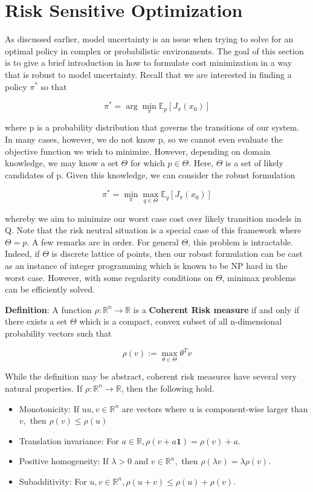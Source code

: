\documentclass[twoside]{article}
\begin{document}
\section{Risk Sensitive Optimization}
As discussed earlier, model uncertainty is an issue when trying to solve for an optimal policy in complex
or probabilistic environments. The goal of this section is to give a brief introduction in how to formulate cost minimization in a way that is robust to model uncertainty. Recall that we are interested in finding a policy $\pi^*$ so that

$$ 
\pi^{*}=\arg \min _{\pi} \mathbb{E}_{p}\left[J_{\pi}\left(x_{0}\right)\right]
 $$

where p is a probability distribution that governs the transitions of our system. In many cases, however, we do not know p, so we cannot even evaluate the objective function we wish to minimize. However, depending on domain knowledge, we may know a set $\Theta$ for which $p\in \Theta$. Here, $\Theta$ is a set of likely candidates of p. Given this knowledge, we can consider the robust formulation

$$ 
\pi^{*}=\min _{\pi} \max _{q \in \Theta} \mathbb{E}_{q}\left[J_{\pi}\left(x_{0}\right)\right]
 $$

whereby we aim to minimize our worst case cost over likely transition models in Q. Note that the risk neutral situation is a special case of this framework where $\Theta = {p}$. A few remarks are in order. For general $\Theta$, this problem is intractable. Indeed, if $\Theta$ is discrete lattice of points, then our robust formulation can be cast as an instance of integer programming which is known to be NP hard in the worst case. However, with some regularity conditions on $\Theta$, minimax problems can be efficiently solved.

\textbf{Definition}: A function $\rho : \mathbb{R}^n \rightarrow \mathbb{R}$ is a \textbf{Coherent Risk measure} if and only if there exists a set $\Theta$ which is
a compact, convex subset of all n-dimensional probability vectors such that

$$ 
\rho(v) :=\max _{\theta \in \Theta} \theta^{T} v
 $$

While the definition may be abstract, coherent risk measures have several very natural properties. If
$\rho : \mathbb{R}^{n} \rightarrow \mathbb{R}$, then the following hold.
\begin{itemize}
\item Monotonicity: If u$u, v \in \mathbb{R}^{n}$ are vectors where u is component-wise larger than $v,$ then $\rho(v) \leq \rho(u)$
\item Translation invariance: For $a \in \mathbb{R}, \rho(v+a \mathbf{1})=\rho(v)+a$.
\item Positive homogeneity: If $\lambda>0$ and $v \in \mathbb{R}^{n},$ then $\rho(\lambda v)=\lambda \rho(v)$.
\item Subadditivity: For $u, v \in \mathbb{R}^{n}, \rho(u+v) \leq \rho(u)+\rho(v)$.
\end{itemize}
\end{document}
